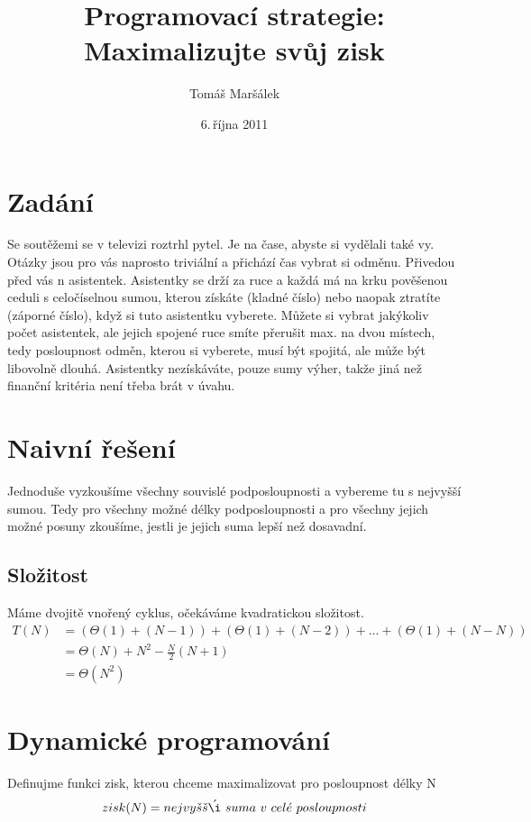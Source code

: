\documentclass[11pt]{article}
\title{Programovací strategie:  Maximalizujte svůj zisk}
\author{Tomáš Maršálek}
\date{6.\,října 2011}
\begin{document}
\maketitle

\section{Zadání}
Se soutěžemi se v televizi roztrhl pytel. Je na čase, abyste si vydělali také 
vy. Otázky jsou pro vás naprosto triviální a přichází čas vybrat si odměnu. 
Přivedou před vás n asistentek. Asistentky se drží za ruce a každá má na krku 
pověšenou ceduli s celočíselnou sumou, kterou získáte (kladné číslo) nebo 
naopak ztratíte (záporné číslo), když si tuto asistentku vyberete. Můžete si 
vybrat jakýkoliv počet asistentek, ale jejich spojené ruce smíte přerušit max. 
na dvou místech, tedy posloupnost odměn, kterou si vyberete, musí být spojitá, 
ale může být libovolně dlouhá. Asistentky nezískáváte, pouze sumy výher, 
takže jiná než finanční kritéria není třeba brát v úvahu.

\section{Naivní řešení}
Jednoduše vyzkoušíme všechny souvislé podposloupnosti a vybereme tu s nejvyšší
sumou. Tedy pro všechny možné délky podposloupnosti a pro všechny jejich možné 
posuny zkoušíme, jestli je jejich suma lepší než dosavadní.


\subsection{Složitost}
Máme dvojitě vnořený cyklus, očekáváme kvadratickou složitost.
\begin{align*}
T(N) &= (\Theta(1) + (N - 1)) + (\Theta(1) + (N - 2)) + \ldots + (\Theta(1) + (N - N)) \\
&= \Theta(N) + N^2 - \frac{N}{2}(N + 1) \\
&= \Theta (N^2)
\end{align*}

\vspace{1cm}

\section{Dynamické programování}
Definujme funkci zisk, kterou chceme maximalizovat pro posloupnost délky N
$$zisk(N) = nejvy\check{s}\check{s}\acute{\i}\ suma\ v\ cel\acute{e}\  
posloupnosti \\ $$
\end{document}
